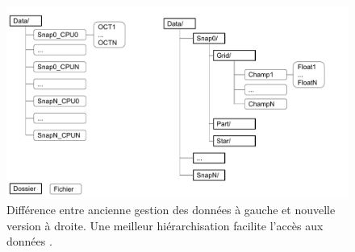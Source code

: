 \begin{figure}
        \includegraphics[width=.95\linewidth]{img/02/data.pdf} 
        \caption[Gestion des IO]{Différence entre ancienne gestion des données à gauche et nouvelle version à droite.
        Une meilleur hiérarchisation facilite l'accès aux données .
 		\label{fig:data}
 		}
\end{figure}





%


